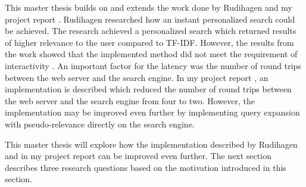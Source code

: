 This master thesis builds on and extends the work done by Rudihagen \cite{master-thesis} and my project report \cite{project-report}.
Rudihagen researched how an instant personalized search could be achieved.
The research achieved a personalized search which returned results of higher relevance to the user compared to TF-IDF.
However, the results from the work showed that the implemented method did not meet the requirement of interactivity \cite{master-thesis}.
An important factor for the latency was the number of round trips between the web server and the search engine.
In my project report \cite{project-report}, an implementation is described which reduced the number of round trips between the web server and the search engine from four to two.
However, the implementation may be improved even further by implementing query expansion with pseudo-relevance directly on the search engine.

This master thesis will explore how the implementation described by Rudihagen and in my project report can be improved even further.
The next section describes three research questions based on the motivation introduced in this section.
